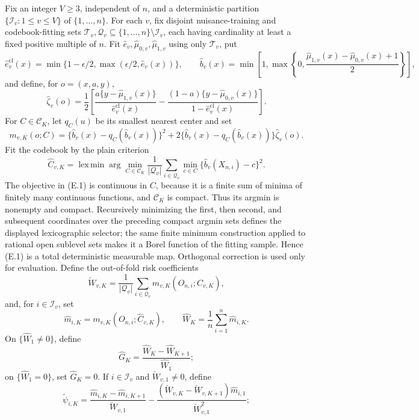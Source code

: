 Fix an integer \(V\geq3\), independent of \(n\), and a deterministic partition \(\{\mathcal I_v:1\leq v\leq V\}\) of \(\{1,\ldots,n\}\).  For each \(v\), fix disjoint nuisance-training and codebook-fitting sets \(\mathcal T_v,\mathcal Q_v\subseteq\{1,\ldots,n\}\setminus\mathcal I_v\), each having cardinality at least a fixed positive multiple of \(n\).  Fit \(\widehat e_v,\widehat\mu_{0,v},\widehat\mu_{1,v}\) using only \(\mathcal T_v\), put
\[
 \widehat e_v^{\mathrm{cl}}(x)=\min\{1-\epsilon/2,\max(\epsilon/2,\widehat e_v(x))\},
 \qquad
 \widehat b_v(x)=\min\!\left[1,\max\!\left\{0,
 \frac{\widehat\mu_{1,v}(x)-\widehat\mu_{0,v}(x)+1}{2}\right\}\right],
\]
and define, for \(o=(x,a,y)\),
\[
 \widehat\zeta_v(o)=\frac12\left[
 \frac{a\{y-\widehat\mu_{1,v}(x)\}}{\widehat e_v^{\mathrm{cl}}(x)}
 -\frac{(1-a)\{y-\widehat\mu_{0,v}(x)\}}{1-\widehat e_v^{\mathrm{cl}}(x)}\right].
\]
For \(C\in\mathcal C_K\), let \(q_C(u)\) be its smallest nearest center and set
\[
 m_{v,K}(o;C)=\{\widehat b_v(x)-q_C(\widehat b_v(x))\}^2
 +2\{\widehat b_v(x)-q_C(\widehat b_v(x))\}\widehat\zeta_v(o).
\]
Fit the codebook by the plain criterion
\[
 \widehat C_{v,K}
 =\operatorname*{lex\,min}\arg\min_{C\in\mathcal C_K}
 \frac1{|\mathcal Q_v|}\sum_{i\in\mathcal Q_v}
 \min_{c\in C}\{\widehat b_v(X_{n,i})-c\}^2.                                  \tag{E.1}
\]
The objective in (E.1) is continuous in \(C\), because it is a finite sum of minima of finitely many continuous functions, and \(\mathcal C_K\) is compact.  Thus its argmin is nonempty and compact.  Recursively minimizing the first, then second, and subsequent coordinates over the preceding compact argmin sets defines the displayed lexicographic selector; the same finite minimum construction applied to rational open sublevel sets makes it a Borel function of the fitting sample.  Hence (E.1) is a total deterministic measurable map.  Orthogonal correction is used only for evaluation.  Define the out-of-fold risk coefficients
\[
 \check W_{v,K}=\frac1{|\mathcal Q_v|}\sum_{i\in\mathcal Q_v}
 m_{v,K}(O_{n,i};\widehat C_{v,K}),
\]
and, for \(i\in\mathcal I_v\), set
\[
 \widehat m_{i,K}=m_{v,K}(O_{n,i};\widehat C_{v,K}),
 \qquad
 \widehat W_K=\frac1n\sum_{i=1}^n\widehat m_{i,K}.
\]
On \(\{\widehat W_1\neq0\}\), define
\[
 \widehat G_K=\frac{\widehat W_K-\widehat W_{K+1}}{\widehat W_1};
\]
on \(\{\widehat W_1=0\}\), set \(\widehat G_K=0\).  If \(i\in\mathcal I_v\) and \(\check W_{v,1}\neq0\), define
\[
 \widetilde\psi_{i,K}=
 \frac{\widehat m_{i,K}-\widehat m_{i,K+1}}{\check W_{v,1}}
 -\frac{(\check W_{v,K}-\check W_{v,K+1})\widehat m_{i,1}}{\check W_{v,1}^2};
\]
